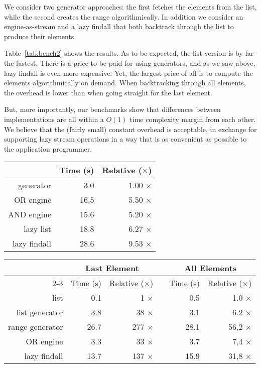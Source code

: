 \documentclass[submission,copyright,creativecommons]{eptcs}
\begin{document}
We consider two generator approaches: the first fetches the elements from the
list, while the second creates the range algorithmically. In addition we
consider an engine-as-stream and a lazy findall that both backtrack through the
list to produce their elements.

Table~\ref{tab:bench2} shows the results. As to be expected, the list version
is by far the fastest. There is a price to be paid for using generators, and as
we saw above, lazy findall is even more expensive. Yet, the largest price of
all is to compute the elements algorithmically on demand. When backtracking
through all elements, the overhead is lower than when going straight
for the last element.

But, more importantly, our benchmarks show that differences between implementations
are all within a $O(1)$  time complexity margin from each other. We believe that the (fairly small) constant overhead is acceptable, in exchange for supporting lazy stream operations in a way that is as convenient as possible to the application programmer.
\newpage
\renewcommand{\arraystretch}{1.2} 
\newcommand{\ra}[1]{\renewcommand{\arraystretch}{#1}}

\begin{table*}\centering
\ra{1.3}
\begin{tabular}{@{}rrr@{}}
\toprule
& Time (s) & Relative ($\times$) \\
\midrule
generator    &   3.0 &  1.00 $\times$  \\ 
OR engine    &  16.5 &  5.50 $\times$  \\
AND engine   &  15.6 &  5.20 $\times$  \\
lazy list    &  18.8 &  6.27 $\times$  \\
lazy findall &  28.6 &  9.53 $\times$  \\
\bottomrule
\end{tabular}
\caption{Benchmark results for accessing the $2^{23}$th element in an infinite stream.}\label{tab:bench1}
\end{table*}

\begin{table*}\centering
\ra{1.3}
\begin{tabular}{@{}rrrlrr@{}}
\toprule
\toprule
& \multicolumn{2}{c}{Last Element} & \phantom{abc} & \multicolumn{2}{c}{All Elements}\\
\cmidrule{2-3}\cmidrule{5-6}
& Time (s) & Relative ($\times$) & & Time (s) & Relative ($\times$)  \\
\midrule
list             &   0.1 &   1 $\times$ & &  0.5 &   1.0 $\times$  \\
list generator   &   3.8 &  38 $\times$ & &  3.1 &   6.2 $\times$  \\ 
range generator  &  26.7 & 277 $\times$ & & 28.1 &  56,2 $\times$  \\ 
OR engine        &   3.3 &  33 $\times$ & &  3.7 &   7,4 $\times$  \\
lazy findall     &  13.7 & 137 $\times$ & & 15.9 &  31,8 $\times$  \\
\bottomrule
\end{tabular}
\caption{Benchmark results for processing a stream of $2^{23}$ elements.}\label{tab:bench2}
\end{table*}
\end{document}
